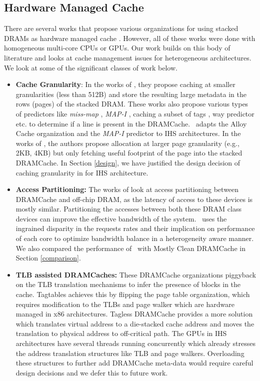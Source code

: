 \subsection{Hardware Managed Cache}
There are several works that propose various organizations for using stacked DRAMs as hardware managed cache \cite{loh-hill,alloy,bimodal,atcache,mostly-clean,bear,tagless-dramcache}. However, all of these works were done with homogeneous multi-core CPUs or GPUs. Our work builds on this body of literature and looks at cache management issues for heterogeneous architectures. We look at some of the significant classes of work below.
\begin{itemize}
\item \textbf{Cache Granularity}: In the works of \cite{loh-hill,alloy,atcache,bimodal}, they propose caching at smaller granularities (less than 512B) and store the resulting large metadata in the rows (pages) of the stacked DRAM. These works also propose various types of predictors like \textit{miss-map} \cite{loh-hill}, \textit{MAP-I} \cite{alloy}, caching a subset of tags \cite{atcache}, way predictor \cite{bimodal} etc. to determine if a line is present in the DRAMCache. \cachename\ adapts the Alloy Cache organization and the \textit{MAP-I} predictor \cite{alloy} to IHS architectures. In the works of \cite{footprint}, the authors propose allocation at larger page granularity (e.g., 2KB, 4KB) but only fetching useful footprint of the page into the stacked DRAMCache. In Section \ref{design}, we have justified the design decision of caching granularity in \cachename for IHS architecture.

\item \textbf{Access Partitioning:} The works of \cite{mostly-clean,mainak-hpca,micro-refresh,bear} look at access partitioning between DRAMCache and off-chip DRAM, as the latency of access to these devices is mostly similar. Partitioning the accesses between both these DRAM class devices can improve the effective bandwidth of the system. \cachename\ uses the ingrained disparity in the requests rates and their implication on performance of each core to optimize bandwidth balance in a heterogeneity aware manner. We also compared the performance of \cachename\ with Mostly Clean DRAMCache \cite{mostly-clean} in Section \ref{comparison}.

\item \textbf{TLB assisted DRAMCaches:} These DRAMCache organizations piggyback on the TLB translation mechanisms to infer the presence of blocks in the cache. Tagtables \cite{tag-tables} achieves this by flipping the page table organization, which requires modification to the TLBs and page walker which are hardware managed in x86 architectures. Tagless DRAMCache \cite{tagless-dramcache} provides a more solution which translates virtual address to a die-stacked cache address and moves the translation to physical address to off-critical path. The GPUs in IHS architectures have several threads running concurrently which already stresses the address translation structures like TLB and page walkers. Overloading these structures to further add DRAMCache meta-data would require careful design decisions and we defer this to future work.

\end{itemize}
